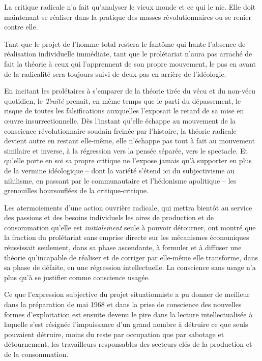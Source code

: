 \documentclass[french,twoside]{book} %
\begin{document}
\noindent La critique radicale n’a fait qu’analyser le vieux monde et ce qui le nie. Elle doit maintenant se réaliser dans la pratique des masses révolutionnaires ou se renier contre elle.\par
Tant que le projet de l’homme total restera le fantôme qui hante l’absence de réalisation individuelle immédiate, tant que le prolétariat n’aura pas arraché de fait la théorie à ceux qui l’apprennent de son propre mouvement, le pas en avant de la radicalité sera toujours suivi de deux pas en arrière de l’idéologie.\par
En incitant les prolétaires à s’emparer de la théorie tirée du vécu et du non-vécu quotidien, le \emph{Traité} prenait, en même temps que le parti du dépassement, le risque de toutes les falsifications auxquelles l’exposait le retard de sa mise en œuvre insurrectionnelle. Dès l’instant qu’elle échappe au mouvement de la conscience révolutionnaire soudain freinée par l’histoire, la théorie radicale devient autre en restant elle-même, elle n’échappe pas tout à fait au mouvement similaire et inverse, à la régression vers la pensée séparée, vers le spectacle. Et qu’elle porte en soi sa propre critique ne l’expose jamais qu’à supporter en plus de la vermine idéologique – dont la variété s’étend ici du subjectivisme au nihilisme, en passant par le communautaire et l’hédonisme apolitique – les grenouilles boursouflées de la critique-critique.\par
Les atermoiements d’une action ouvrière radicale, qui mettra bientôt au service des passions et des besoins individuels les aires de production et de consommation qu’elle est \emph{initialement} seule à pouvoir détourner, ont montré que la fraction du prolétariat sans emprise directe sur les mécanismes économiques réussissait seulement, dans sa phase ascendante, à formuler et à diffuser une théorie qu’incapable de réaliser et de corriger par elle-même elle transforme, dans sa phase de défaite, en une régression intellectuelle. La conscience sans usage n’a plus qu’à se justifier comme conscience usagée.\par
Ce que l’expression subjective du projet situationniste a pu donner de meilleur dans la préparation de mai 1968 et dans la prise de conscience des nouvelles formes d’exploitation est ensuite devenu le pire dans la lecture intellectualisée à laquelle s’est résignée l’impuissance d’un grand nombre à détruire ce que seuls pouvaient détruire, moins du reste par occupation que par sabotage et détournement, les travailleurs responsables des secteurs clés de la production et de la consommation.\par
\end{document}
